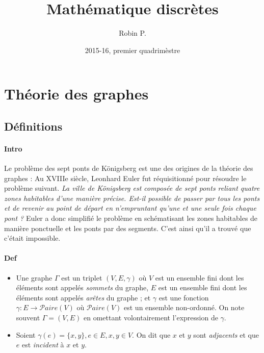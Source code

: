\documentclass{article}
\title{Mathématique discrètes}
\date{2015-16, premier quadrimèstre}
\author{Robin P.}
\newenvironment{lst}
	{\begin{minipage}[t]{.9\linewidth}\begin{itemize}}
	{\end{itemize}\end{minipage}}
\begin{document}
	\maketitle
	\tableofcontents
	\pagebreak
	\clearpage
	\setcounter{page}{1}

	\section{Théorie des graphes}

		\subsection{Définitions}

			\paragraph{Intro} Le problème des sept ponts de Königsberg est une des origines de la théorie des graphes : Au XVIIIe siècle, Leonhard
			Euler fut réquisitionné pour résoudre le problème suivant. \textit{La ville de Königsberg est composée de sept ponts reliant quatre zones
			habitables d'une manière précise. Est-il possible de passer par tous les ponts et de revenir au point de départ en n'empruntant qu'une et
			une seule fois chaque pont ?} Euler a donc simplifié le problème en schématisant les zones habitables de manière ponctuelle et les ponts
			par des segments. C'est ainsi qu'il a trouvé que c'était impossible.

			\paragraph{Def}
				\begin{lst}
					\item Une graphe $\Gamma$ est un triplet $(V, E, \gamma)$ où $V$ est un ensemble fini dont les éléments sont appelés \textit{
						  sommets} du graphe, $E$ est un ensemble fini dont les éléments sont appelés \textit{arêtes} du graphe ; et $\gamma$ est
						  une fonction $\gamma : E \to \mathcal Paire(V)$ où $\mathcal Paire(V)$ est un ensemble non-ordonné. On note souvent
						  $\Gamma = (V, E)$ en omettant volontairement l'expression de $\gamma$.

					\item Soient $\gamma(e) = \{x, y\}, e \in E, x, y \in V$. On dit que $x$ et $y$ sont \textit{adjacents} et que $e$ est
					\textit{incident} à $x$ et $y$.
				\end{lst}
\end{document}
